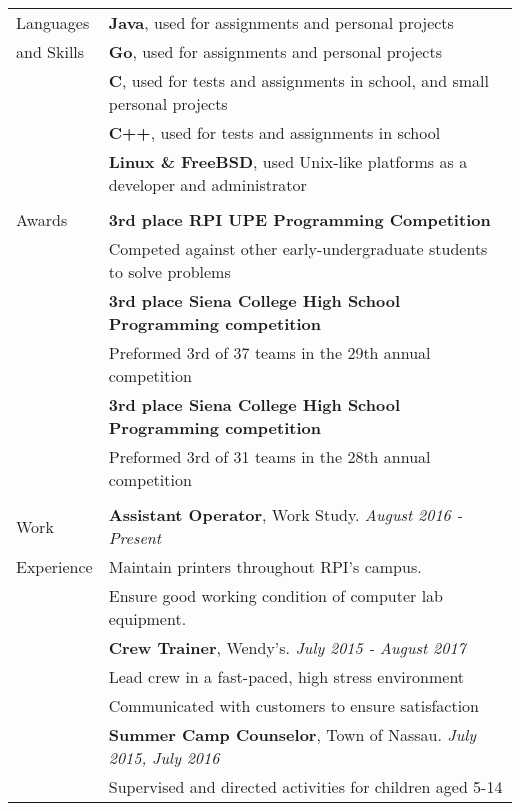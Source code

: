 \documentclass[letterpaper,10pt,oneside]{article}
\begin{document}
\begin{tabular}{@{} l l}
  \Large{Languages}
  & \textbf{Java}, used for assignments and personal projects \\
  \Large{and Skills}
  & \textbf{Go}, used for assignments and personal projects \\
  & \textbf{C}, used for tests and assignments in school, and small personal projects \\
  & \textbf{C++}, used for tests and assignments in school \\
  & \textbf{Linux \& FreeBSD}, used Unix-like platforms as a developer and administrator \\
  & \\

  \Large{Awards}
  & \textbf{3rd place RPI UPE Programming Competition} \\
  & Competed against other early-undergraduate students to solve problems \\
  & \textbf{3rd place Siena College High School Programming competition} \\
  & Preformed 3rd of 37 teams in the 29th annual competition \\
  & \textbf{3rd place Siena College High School Programming competition} \\
  & Preformed 3rd of 31 teams in the 28th annual competition \\
  & \\

  \Large{Work}
  & \textbf{Assistant Operator}, Work Study. \textit{August 2016 - Present} \\
  \Large{Experience}
  & Maintain printers throughout RPI's campus. \\
  & Ensure good working condition of computer lab equipment. \\
  & \textbf{Crew Trainer}, Wendy's. \textit{July 2015 - August 2017} \\
  & Lead crew in a fast-paced, high stress environment \\
  & Communicated with customers to ensure satisfaction \\
  & \textbf{Summer Camp Counselor}, Town of Nassau. \textit{July 2015, July 2016} \\
  & Supervised and directed activities for children aged 5-14 \\

\end{tabular}
\end{document}
